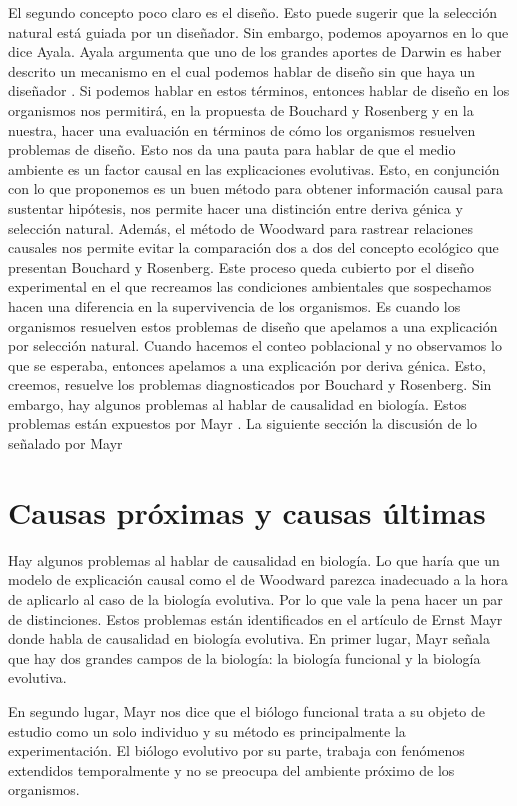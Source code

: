  El segundo concepto poco claro es el diseño. Esto puede sugerir que la selección natural está guiada por un diseñador. Sin embargo, podemos apoyarnos en lo que dice Ayala. Ayala argumenta que uno de los grandes aportes de Darwin es haber descrito un mecanismo en el cual podemos hablar de diseño sin que haya un diseñador \cite{Ayala2004}. Si podemos hablar en estos términos, entonces hablar de diseño en los organismos nos permitirá, en la propuesta de Bouchard y Rosenberg y en la nuestra, hacer una evaluación en términos de cómo los organismos resuelven problemas de diseño. Esto nos da una pauta para hablar de que el medio ambiente es un factor causal en las explicaciones evolutivas. Esto, en conjunción con lo que proponemos es un buen método para obtener información causal para sustentar hipótesis, nos permite hacer una distinción entre deriva génica y selección natural. Además, el método de Woodward para rastrear relaciones causales nos permite evitar la comparación dos a dos del concepto ecológico que presentan Bouchard y Rosenberg. Este proceso queda cubierto por el diseño experimental en el que recreamos las condiciones ambientales que sospechamos hacen una diferencia en la supervivencia de los organismos. Es cuando los organismos resuelven estos problemas de diseño que apelamos a una explicación por selección natural. Cuando hacemos el conteo poblacional y no observamos lo que se esperaba, entonces apelamos a una explicación por deriva génica. Esto, creemos, resuelve los problemas diagnosticados por Bouchard y Rosenberg. Sin embargo, hay algunos problemas al hablar de causalidad en biología. Estos problemas están expuestos por Mayr \cite{Mayr1998}. La siguiente sección la discusión de lo señalado por Mayr


\section{Causas próximas y causas últimas}

Hay algunos problemas al hablar de causalidad en biología. Lo que haría que un modelo de explicación causal como el de Woodward parezca inadecuado a la hora de aplicarlo al caso de la biología evolutiva. Por lo que vale la pena hacer un par de distinciones. Estos problemas están identificados en el artículo de Ernst Mayr \citeyear{Mayr1998} donde habla de causalidad en biología evolutiva. En primer lugar, Mayr señala que hay dos grandes campos de la biología: la biología funcional y la biología evolutiva.

En segundo lugar, Mayr nos dice que el biólogo funcional trata a su objeto de estudio como un solo individuo y su método es principalmente la experimentación. El biólogo evolutivo por su parte, trabaja con fenómenos extendidos temporalmente y no se preocupa del ambiente próximo de los organismos.

